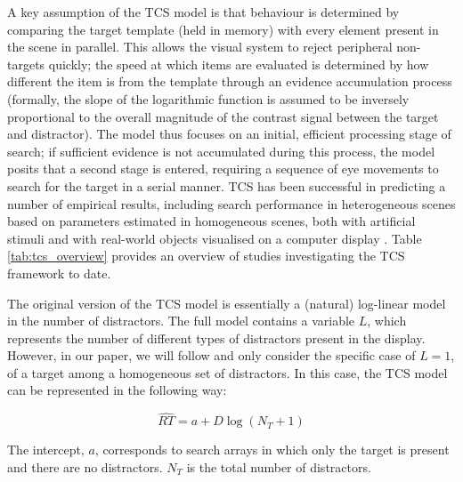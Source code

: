 \documentclass[preprint,12pt,authoryear]{elsarticle}
\begin{document}
A key assumption of the TCS model is that behaviour is determined by comparing the target template (held in memory) with every element present in the scene in parallel. This allows the visual system to reject peripheral non-targets quickly; the speed at which items are evaluated is determined by how different the item is from the template through an evidence accumulation process (formally, the slope of the logarithmic function is assumed to be inversely proportional to the overall magnitude of the contrast signal between the target and distractor). The model thus focuses on an initial, efficient processing stage of search; if sufficient evidence is not accumulated during this process, the model posits that a second stage is entered, requiring a sequence of eye movements to search for the target in a serial manner. TCS has been successful in predicting a number of empirical results, including search performance in heterogeneous scenes based on parameters estimated in homogeneous scenes, both with artificial stimuli \citep{buetti2016towards,lleras2019predicting} and with real-world objects visualised on a computer display \citep{wang2017predicting}. Table \ref{tab:tcs_overview} provides an overview of studies investigating the TCS framework to date.
 
The original version of the TCS model is essentially a (natural) log-linear model in the number of distractors. The full model contains a variable $L$, which represents the number of different types of distractors present in the display. However, in our paper, we will follow \cite{buetti2019predicting} and only consider the specific case of $L=1$, of a target among a homogeneous set of distractors. In this case, the TCS model can be represented in the following way:


\begin{equation}
\hat{RT} = a + D\log(N_T+1)
\label{eq:loglin}
\end{equation}

The intercept, $a$, corresponds to search arrays in which only the target is present and there are no distractors. $N_T$ is the total number of distractors.
\end{document}
